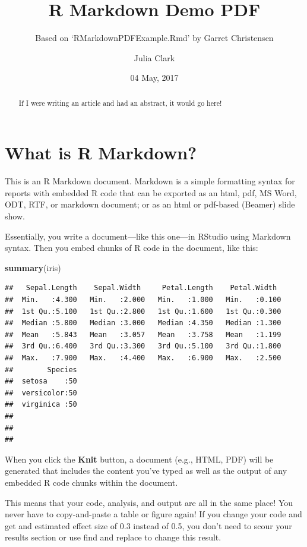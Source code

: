 \documentclass[11pt,]{article}
\title{R Markdown Demo PDF}
\subtitle{Based on `RMarkdownPDFExample.Rmd' by Garret Christensen}
\author{Julia Clark}
\date{04 May, 2017}
\newenvironment{Shaded}{\begin{snugshade}}{\end{snugshade}}
\newcommand{\KeywordTok}[1]{\textcolor[rgb]{0.13,0.29,0.53}{\textbf{{#1}}}}
\newcommand{\NormalTok}[1]{{#1}}
\begin{document}
\maketitle
\begin{abstract}
If I were writing an article and had an abstract, it would go here!
\end{abstract}

\section{What is R Markdown?}\label{what-is-r-markdown}

This is an R Markdown document. Markdown is a simple formatting syntax
for reports with embedded R code that can be exported as an html, pdf,
MS Word, ODT, RTF, or markdown document; or as an html or pdf-based
(Beamer) slide show.

Essentially, you write a document---like this one---in RStudio using
Markdown syntax. Then you embed chunks of R code in the document, like
this:

\begin{Shaded}
\begin{Highlighting}[]
\KeywordTok{summary}\NormalTok{(iris)}
\end{Highlighting}
\end{Shaded}

\begin{verbatim}
##   Sepal.Length    Sepal.Width     Petal.Length    Petal.Width   
##  Min.   :4.300   Min.   :2.000   Min.   :1.000   Min.   :0.100  
##  1st Qu.:5.100   1st Qu.:2.800   1st Qu.:1.600   1st Qu.:0.300  
##  Median :5.800   Median :3.000   Median :4.350   Median :1.300  
##  Mean   :5.843   Mean   :3.057   Mean   :3.758   Mean   :1.199  
##  3rd Qu.:6.400   3rd Qu.:3.300   3rd Qu.:5.100   3rd Qu.:1.800  
##  Max.   :7.900   Max.   :4.400   Max.   :6.900   Max.   :2.500  
##        Species  
##  setosa    :50  
##  versicolor:50  
##  virginica :50  
##                 
##                 
## 
\end{verbatim}

When you click the \textbf{Knit} button, a document (e.g., HTML, PDF)
will be generated that includes the content you've typed as well as the
output of any embedded R code chunks within the document.

This means that your code, analysis, and output are all in the same
place! You never have to copy-and-paste a table or figure again! If you
change your code and get and estimated effect size of 0.3 instead of
0.5, you don't need to scour your results section or use find and
replace to change this result.
\end{document}
